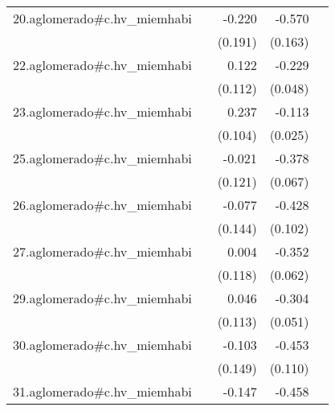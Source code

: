 {\begin{longtable}{l*{4}{D{.}{.}{-1}}}
\addlinespace
20.aglomerado#c.hv\_miemhabi&                     &      -0.220         &      -0.570\sym{***}&                     \\
            &                     &     (0.191)         &     (0.163)         &                     \\
\addlinespace
22.aglomerado#c.hv\_miemhabi&                     &       0.122         &      -0.229\sym{***}&                     \\
            &                     &     (0.112)         &     (0.048)         &                     \\
\addlinespace
23.aglomerado#c.hv\_miemhabi&                     &       0.237\sym{*}  &      -0.113\sym{***}&                     \\
            &                     &     (0.104)         &     (0.025)         &                     \\
\addlinespace
25.aglomerado#c.hv\_miemhabi&                     &      -0.021         &      -0.378\sym{***}&                     \\
            &                     &     (0.121)         &     (0.067)         &                     \\
\addlinespace
26.aglomerado#c.hv\_miemhabi&                     &      -0.077         &      -0.428\sym{***}&                     \\
            &                     &     (0.144)         &     (0.102)         &                     \\
\addlinespace
27.aglomerado#c.hv\_miemhabi&                     &       0.004         &      -0.352\sym{***}&                     \\
            &                     &     (0.118)         &     (0.062)         &                     \\
\addlinespace
29.aglomerado#c.hv\_miemhabi&                     &       0.046         &      -0.304\sym{***}&                     \\
            &                     &     (0.113)         &     (0.051)         &                     \\
\addlinespace
30.aglomerado#c.hv\_miemhabi&                     &      -0.103         &      -0.453\sym{***}&                     \\
            &                     &     (0.149)         &     (0.110)         &                     \\
\addlinespace
31.aglomerado#c.hv\_miemhabi&                     &      -0.147         &      -0.458\sym{***}&                     \\

\end{longtable}}
